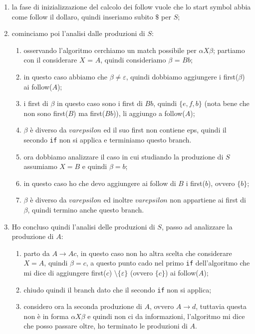 \documentclass[class=book, crop=false, oneside, 12pt]{standalone}
\begin{document}
\begin{enumerate}
    \item la fase di inizializzazione del calcolo dei follow vuole che lo start symbol abbia come follow il dollaro, quindi inseriamo subito \(\$\) per \(S\);
    \item cominciamo poi l'analisi dalle produzioni di \(S\):
    \begin{enumerate}
        \item osservando l'algoritmo cerchiamo un match possibile per \(\alpha X \beta\); partiamo con il considerare \(X\) = \(A\), quindi consideriamo \(\beta\) = \(Bb\);
        \item in questo caso abbiamo che \(\beta \neq \varepsilon\), quindi dobbiamo aggiungere i first(\(\beta\)) ai follow(\(A\));
        \item i first di \(\beta\) in questo caso sono i first di \(Bb\), quindi \(\{e, f, b\}\) (nota bene che non sono first(\(B\)) ma first(\(Bb\))), li aggiungo a follow(\(A\));
        \item \(\beta\) è diverso da \(varepsilon\) ed il suo first non contiene eps, quindi il secondo \texttt{if} non si applica e terminiamo questo branch.
        \item ora dobbiamo analizzare il caso in cui studiando la produzione di \(S\) assumiamo \(X = B\) e quindi \(\beta = b\);
        \item in questo caso ho che devo aggiungere ai follow di \(B\) i first(\(b\)), ovvero \(\{b\}\);
        \item \(\beta\) è diverso da \(varepsilon\) ed inoltre \(varepsilon\) non appartiene ai first di \(\beta\), quindi termino anche questo branch.
    \end{enumerate}
    \item Ho concluso quindi l’analisi delle produzioni di \(S\), passo ad analizzare la produzione di \(A\):
    \begin{enumerate}
        \item parto da \(A \to Ac\), in questo caso non ho altra scelta che considerare \(X = A\), quindi \(\beta = c\), a questo punto cado nel primo \texttt{if} dell'algoritmo che mi dice di aggiungere first(\(c\)) \(\setminus \{\varepsilon\}\) (ovvero \(\{c\}\)) ai follow(\(A\));
        \item chiudo quindi il branch dato che il secondo \texttt{if} non si applica;
        \item considero ora la seconda produzione di \(A\), ovvero \(A \to d\), tuttavia questa non è in forma \(\alpha X \beta\) e quindi non ci da informazioni, l'algoritmo mi dice che posso passare oltre, ho terminato le produzioni di \(A\).

\end{enumerate}
\end{enumerate}
\end{document}

